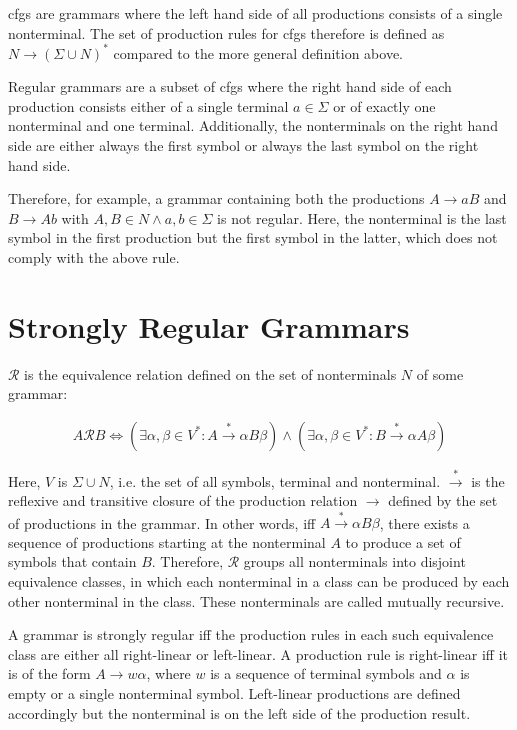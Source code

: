 \Acfp{cfg} are grammars where the left hand side of all productions consists of a single nonterminal. The set of production rules for \acp{cfg} therefore is defined as $N \rightarrow (\Sigma \cup N)^*$ compared to the more general definition above.

Regular grammars are a subset of \acp{cfg} where the right hand side of each production consists either of a single terminal $a \in \Sigma$ or of exactly one nonterminal and one terminal. Additionally, the nonterminals on the right hand side are either always the first symbol or always the last symbol on the right hand side. 

Therefore, for example, a grammar containing both the productions $A \rightarrow aB$ and $B \rightarrow Ab$ with $A, B \in N \land a, b \in \Sigma$ is not regular. Here, the nonterminal is the last symbol in the first production but the first symbol in the latter, which does not comply with the above rule.

\section{Strongly Regular Grammars}\label{sec:background:srg}

$\mathcal{R}$ is the equivalence relation defined on the set of nonterminals $N$ of some grammar:

\begin{align}
	A \mathcal{R} B \Leftrightarrow (\exists \alpha, \beta \in V^* : A \xrightarrow{*} \alpha B \beta) \land (\exists \alpha, \beta \in V^* : B \xrightarrow{*} \alpha A \beta) 
\end{align}

Here, $V$ is $\Sigma \cup N$, i.e. the set of all symbols, terminal and nonterminal. $\xrightarrow{*}$ is the reflexive and transitive closure of the production relation $\rightarrow$ defined by the set of productions in the grammar. In other words, iff $A \xrightarrow{*} \alpha B \beta$, there exists a sequence of productions starting at the nonterminal $A$ to produce a set of symbols that contain $B$. Therefore, $\mathcal{R}$ groups all nonterminals into disjoint equivalence classes, in which each nonterminal in a class can be produced by each other nonterminal in the class. These nonterminals are called mutually recursive.

A grammar is strongly regular iff the production rules in each such equivalence class are either all right-linear or left-linear.
A production rule is right-linear iff it is of the form $A \rightarrow w \alpha$, where $w$ is a sequence of terminal symbols and $\alpha$ is empty or a single nonterminal symbol. Left-linear productions are defined accordingly but the nonterminal is on the left side of the production result.

